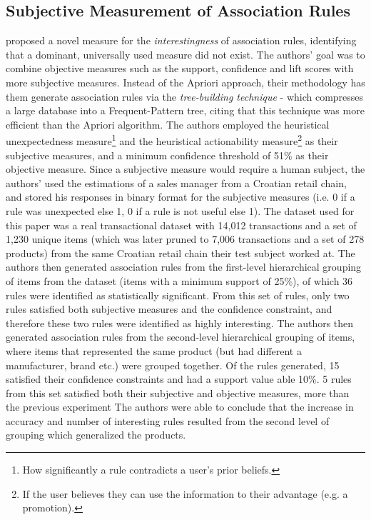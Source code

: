 \subsection{Subjective Measurement of Association Rules}
 proposed a novel measure for the \textit{interestingness} of association rules,  identifying that a dominant, universally used measure did not exist. The authors' goal was to combine objective measures such as the support, confidence and lift scores with more subjective measures. Instead of the Apriori approach, their methodology has them generate association rules via the \textit{tree-building technique} - which compresses a large database into a Frequent-Pattern tree, citing that this technique was more efficient than the Apriori algorithm. The authors employed the heuristical unexpectedness measure\footnote{How significantly a rule contradicts a user's prior beliefs.} and the heuristical actionability measure\footnote{If the user believes they can use the information to their advantage (e.g. a promotion).} as their subjective measures, and a minimum confidence threshold of 51\% as their objective measure.  Since a subjective measure would require a human subject, the authors' used the estimations of a sales manager from a Croatian retail chain, and stored his responses in binary format for the subjective measures (i.e. 0 if a rule was unexpected else 1, 0 if a rule is not useful else 1). The dataset used for this paper was a real transactional dataset with 14,012 transactions and a set of 1,230 unique items (which was later pruned to 7,006 transactions and a set of 278 products) from the same Croatian retail chain their test subject worked at. The authors then generated association rules from the first-level hierarchical grouping of items from the dataset (items with a minimum support of 25\%),  of which 36 rules were identified as statistically significant.  From this set of rules, only two rules satisfied both subjective measures and the confidence constraint, and therefore these two rules were identified as highly interesting.  The authors then generated association rules from the second-level hierarchical grouping of items, where items that represented the same product (but had different a manufacturer, brand etc.) were grouped together. Of the rules generated, 15 satisfied their confidence constraints and had a support value able 10\%. 5 rules from this set satisfied both their subjective and objective measures,  more than the previous experiment  The authors were able to conclude that the increase in accuracy and number of interesting rules resulted from the second level of grouping which generalized the products.\\

